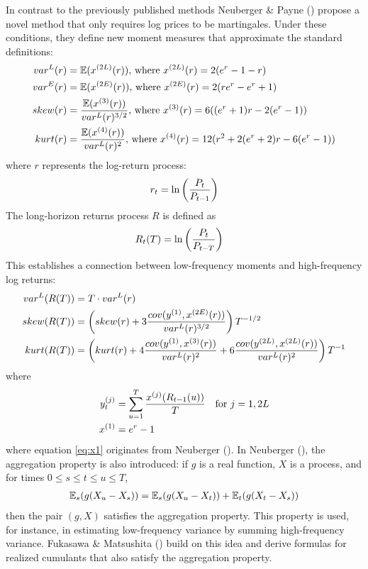 In contrast to the previously published methods Neuberger \& Payne (\citeyear{neubergerSkewnessStockMarket2021}) propose a novel method that only requires log prices to be martingales. Under these conditions, they define new moment measures that approximate the standard definitions:
\begin{align}
    var^L(r) &= \mathbb{E}(x^{(2L)}(r))\text{, where } x^{(2L)}(r) = 2(e^r-1-r) \notag \\
    var^E(r) &= \mathbb{E}(x^{(2E)}(r))\text{, where } x^{(2E)}(r) = 2(re^r-e^r+1) \notag \\
    skew(r) &= \frac{\mathbb{E}(x^{(3)}(r))}{var^L(r)^{3/2}}\text{, where } x^{(3)}(r) = 6((e^r+1)r - 2(e^r-1)) \notag \\
    kurt(r) &= \frac{\mathbb{E}(x^{(4)}(r))}{var^L(r)^2}\text{, where } x^{(4)}(r) = 12(r^2 + 2(e^r+2)r - 6(e^r-1)) \notag
\end{align}
where $r$ represents the log-return process:
\begin{align}
    r_t = \ln\left(\frac{P_t}{P_{t-1}}\right) \notag
\end{align}
The long-horizon returns process $R$ is defined as
\begin{align}
    R_t(T) &= \ln\left(\frac{P_t}{P_{t-T}}\right) \notag
\end{align}
This establishes a connection between low-frequency moments and high-frequency log returns:
\begin{align}
    var^L(R(T)) &= T\cdot var^L(r) \notag \\
    skew(R(T)) &= \left(skew(r) + 3\frac{cov(y^{(1)}, x^{(2E)}(r))}{var^L(r)^{3/2}}\right)T^{-1/2} \notag \\
    kurt(R(T)) &= \left(kurt(r) + 4\frac{cov(y^{(1)}, x^{(3)}(r))}{var^L(r)^2} + 6\frac{cov(y^{(2L)}, x^{(2L)}(r))}{var^L(r)^2}\right)T^{-1} \notag
\end{align}
where
\begin{align}
    y_t^{(j)} &= \sum_{u=1}^T \frac{x^{(j)}(R_{t-1}(u))}{T} \quad\text{for } j = 1,2L\notag \\
    \label{eq:x1}
    x^{(1)} &= e^r-1
\end{align}
where equation \eqref{eq:x1} originates from Neuberger (\citeyear{neubergerRealizedSkewness2012}). In Neuberger (\citeyear{neubergerRealizedSkewness2012}), the aggregation property is also introduced: if $g$ is a real function, $X$ is a process, and for times $0\le s\le t\le u\le T$,
\begin{align}
    \mathbb{E}_s(g(X_u-X_s)) = \mathbb{E}_s(g(X_u-X_t)) + \mathbb{E}_t(g(X_t-X_s))\notag
\end{align}
then the pair $(g,X)$ satisfies the aggregation property. This property is used, for instance, in estimating low-frequency variance by summing high-frequency variance. Fukasawa \& Matsushita (\citeyear{fukasawaRealizedCumulantsMartingales2021}) build on this idea and derive formulas for realized cumulants that also satisfy the aggregation property.